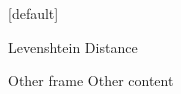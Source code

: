 {%
[default]
\makeatletter\def\beamer@entrycode{\vspace*{-\headheight}}\makeatother
\begin{frame}{Levenshtein Distance}
  \begin{center}
    \begin{adjustbox}{width=0.8\linewidth}
      \def\AlgoIntro{1}
      \def\AlgoFinal{0}
      
    \end{adjustbox}
  \end{center}
\end{frame}
}%


\begin{frame}{Other frame}
  Other content
\end{frame}